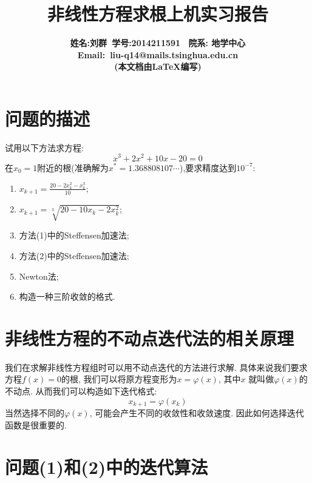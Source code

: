 \documentclass[a4paper]{article}
\begin{document}
\begin{CJK*}{GBK}{song}
\title{\bf{非线性方程求根上机实习报告}}
\author{\bf{姓名:刘群\ 学号:2014211591 \ 院系: 地学中心}\\ \bf{Email}:\ liu-q14@mails.tsinghua.edu.cn \\ (本文档由\LaTeX{}编写)}
\maketitle

\section{问题的描述}

试用以下方法求方程:
\begin{equation}
x^3+2x^2+10x-20=0
\end{equation}\label{init_eq}
在$x_0=1$附近的根(准确解为$x^*=1.368808107\cdots$),要求精度达到$10^{-7}$:
\par
\begin{enumerate}[(1)]
\item $x_{k+1}=\frac{20-2x_k^2-x_k^3}{10}$;\par
\item $x_{k+1}=\sqrt[3]{20-10x_k-2x_k^2}$;
\item 方法(1)中的Steffensen加速法;
\item 方法(2)中的Steffensen加速法;
\item Newton法;
\item 构造一种三阶收敛的格式.
\end{enumerate}

\section{非线性方程的不动点迭代法的相关原理}
我们在求解非线性方程组时可以用不动点迭代的方法进行求解. 具体来说我们要求方程$f(x)=0$的根, 我们可以将原方程变形为$x=\varphi(x)$, 其中$x$ 就叫做$\varphi(x)$的不动点. 从而我们可以构造如下迭代格式:
\begin{equation}
x_{k+1}=\varphi(x_k)
\end{equation}
当然选择不同的$\varphi(x)$, 可能会产生不同的收敛性和收敛速度. 因此如何选择迭代函数是很重要的.

\section{问题(1)和(2)中的迭代算法}


\end{CJK*}
\end{document}

